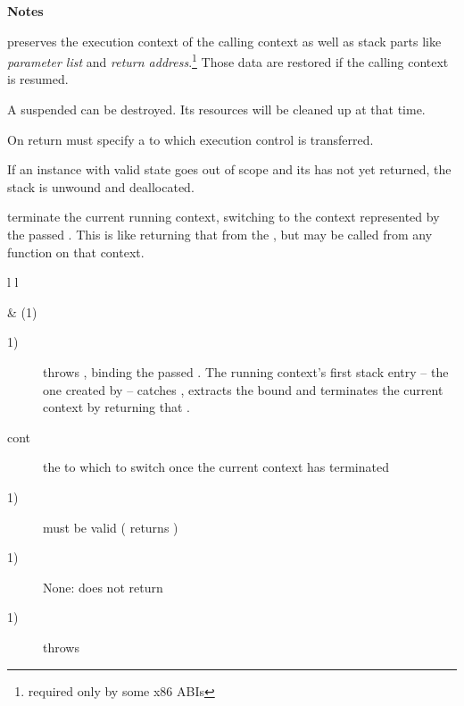 {\bfseries Notes}
\begin{description}
\item \callcc preserves the execution context of the calling context as well as stack
parts like \emph{parameter list} and \emph{return address}.\footnote{required
only by some x86 ABIs} Those data are restored if the calling context is resumed.
\item A suspended  can be destroyed. Its resources will be cleaned
up at that time.
\item On return  must specify a \cont to which execution control is
transferred.
\item If an instance with valid state goes out of scope and its  has not yet
returned, the stack is unwound and deallocated.
\end{description}


terminate the current running context, switching to the context represented by
the passed \cont. This is like returning that \cont from the \entryfn, but may
be called from any function on that context.

\begin{tabular}{ l l }
    \midrule

     & (1)\\

    \midrule
\end{tabular}

\begin{description}
    \item[1)] throws \unwindex, binding the passed \cont. The running
              context's first stack entry -- the one created by \callcc --
              catches \unwindex, extracts the bound \cont and terminates the
              current context by returning that \cont.
\end{description}

\begin{description}
    \item[cont] the \cont to which to switch once the current context has terminated
\end{description}

\begin{description}
    \item[1)]  must be valid ( returns )
\end{description}

\begin{description}
    \item[1)] None: \unwindcont does not return
\end{description}

\begin{description}
    \item[1)] throws \unwindex
\end{description}
